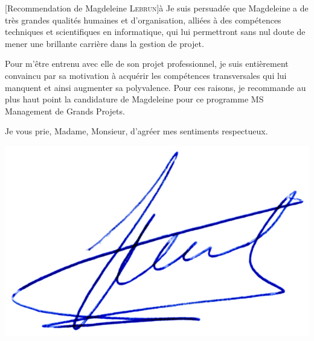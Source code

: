 \documentclass[a4paper,10pt]{article}
\begin{document}
\begin{letter}[Recommendation de Magdeleine \textsc{Lebrun}]{à}
Je suis persuadée que Magdeleine a de très grandes qualités humaines et
d'organisation, alliées à des compétences techniques et scientifiques en
informatique, qui lui permettront sans nul doute de mener une brillante
carrière dans la gestion de projet.

Pour m'être entrenu  avec elle de son projet professionnel,  je suis entièrement
convaincu par  sa motivation  à acquérir les  compétences transversales  qui lui
manquent et ainsi augmenter sa polyvalence.   Pour ces raisons, je recommande au
plus haut point la candidature de  Magdeleine pour ce programme MS Management de
Grands Projets.


Je vous prie, Madame, Monsieur, d'agréer mes sentiments respectueux.

\end{letter}
\begin{flushright}
\includegraphics[width=.2\textwidth]{signgenaud.jpg}
\end{flushright}
\end{document}
